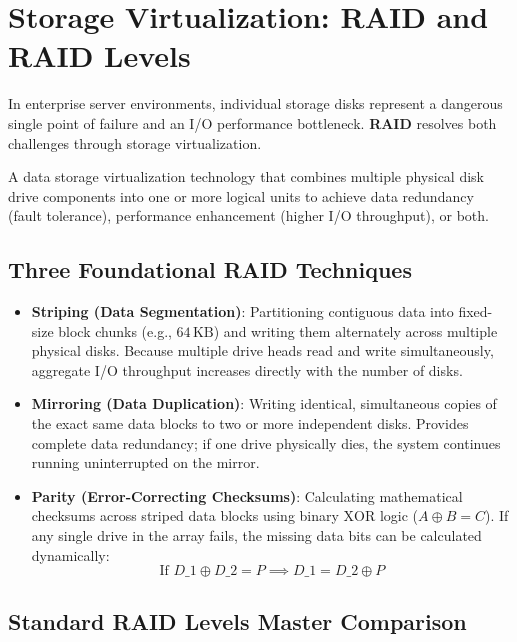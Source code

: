 \section{Storage Virtualization: RAID and RAID Levels}

In enterprise server environments, individual storage disks represent a dangerous single point of failure and an I/O performance bottleneck. \textbf{RAID} resolves both challenges through storage virtualization.

\begin{definition}
A data storage virtualization technology that combines multiple physical disk drive components into one or more logical units to achieve data redundancy (fault tolerance), performance enhancement (higher I/O throughput), or both.
\end{definition}

\subsection{Three Foundational RAID Techniques}
\begin{itemize}[leftmargin=1.5em]
    \item \textbf{Striping (Data Segmentation)}: Partitioning contiguous data into fixed-size block chunks (e.g., $64\,\text{KB}$) and writing them alternately across multiple physical disks. Because multiple drive heads read and write simultaneously, aggregate I/O throughput increases directly with the number of disks.
    \item \textbf{Mirroring (Data Duplication)}: Writing identical, simultaneous copies of the exact same data blocks to two or more independent disks. Provides complete data redundancy; if one drive physically dies, the system continues running uninterrupted on the mirror.
    \item \textbf{Parity (Error-Correcting Checksums)}: Calculating mathematical checksums across striped data blocks using binary $\text{XOR}$ logic ($A \oplus B = C$). If any single drive in the array fails, the missing data bits can be calculated dynamically:
    \begin{equation}
        \text{If } D\_1 \oplus D\_2 = P \implies D\_1 = D\_2 \oplus P
    \end{equation}
\end{itemize}

\subsection{Standard RAID Levels Master Comparison}

